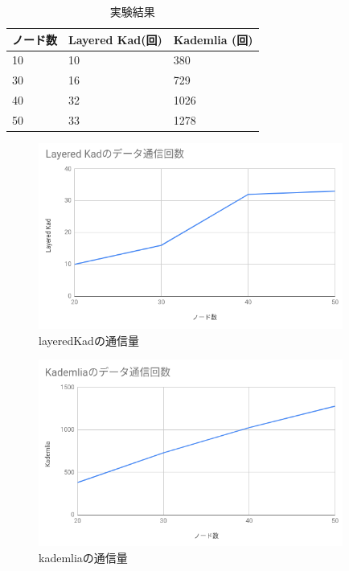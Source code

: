 \documentclass[sotsuron]{jcsie}
\begin{document}
\begin{table}[H]
	\caption{実験結果}	
	\centering
	\label{table:traffic-result}
	\begin{tabular}{|l|l|l|}
		\hline
		ノード数     &   
		Layered Kad(回) &   
		Kademlia (回)\\ 
		\hline
		10               &   
		10               &   
		380\\
		\hline
		30               &   
		16               &   
		729\\
		\hline
		40               &   
		32               &   
		1026\\
		\hline
		50               &   
		33               &   
		1278\\
		\hline
	\end{tabular}	
\end{table}

\begin{figure}[H]
	\centering
	\includegraphics[width=10cm]{./assets/image/layered-kad_traffic.png}
	\caption{layeredKadの通信量}	
\end{figure}

\begin{figure}[H]
	\centering
	\includegraphics[width=10cm]{./assets/image/kad_traffic.png}
	\caption{kademliaの通信量}	
\end{figure}
\end{document}

